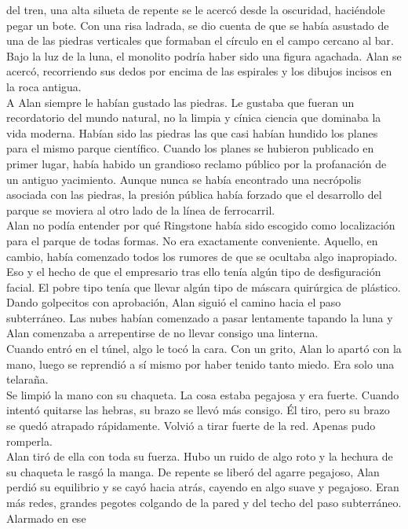 del tren, una alta silueta de repente se le acercó desde la oscuridad,
haciéndole pegar un bote. Con una risa ladrada, se dio cuenta de que se
había asustado de una de las piedras verticales que formaban el círculo
en el campo cercano al bar. Bajo la luz de la luna, el monolito podría
haber sido una figura agachada. Alan se acercó, recorriendo sus dedos
por encima de las espirales y los dibujos incisos en la roca antigua.\\
A Alan siempre le habían gustado las piedras. Le gustaba que fueran un
recordatorio del mundo natural, no la limpia y cínica ciencia que
dominaba la vida moderna. Habían sido las piedras las que casi habían
hundido los planes para el mismo parque científico. Cuando los planes se
hubieron publicado en primer lugar, había habido un grandioso reclamo
público por la profanación de un antiguo yacimiento. Aunque nunca se
había encontrado una necrópolis asociada con las piedras, la presión
pública había forzado que el desarrollo del parque se moviera al otro
lado de la línea de ferrocarril.\\
Alan no podía entender por qué Ringstone había sido escogido como
localización para el parque de todas formas. No era exactamente
conveniente. Aquello, en cambio, había comenzado todos los rumores de
que se ocultaba algo inapropiado. Eso y el hecho de que el empresario
tras ello tenía algún tipo de desfiguración facial. El pobre tipo tenía
que llevar algún tipo de máscara quirúrgica de plástico.\\
Dando golpecitos con aprobación, Alan siguió el camino hacia el paso
subterráneo. Las nubes habían comenzado a pasar lentamente tapando la
luna y Alan comenzaba a arrepentirse de no llevar consigo una
linterna.\\
Cuando entró en el túnel, algo le tocó la cara. Con un grito, Alan lo
apartó con la mano, luego se reprendió a sí mismo por haber tenido tanto
miedo. Era solo una telaraña.\\
Se limpió la mano con su chaqueta. La cosa estaba pegajosa y era fuerte.
Cuando intentó quitarse las hebras, su brazo se llevó más consigo. Él
tiro, pero su brazo se quedó atrapado rápidamente. Volvió a tirar fuerte
de la red. Apenas pudo romperla.\\
Alan tiró de ella con toda su fuerza. Hubo un ruido de algo roto y la
hechura de su chaqueta le rasgó la manga. De repente se liberó del
agarre pegajoso, Alan perdió su equilibrio y se cayó hacia atrás,
cayendo en algo suave y pegajoso. Eran más redes, grandes pegotes
colgando de la pared y del techo del paso subterráneo. Alarmado en ese
